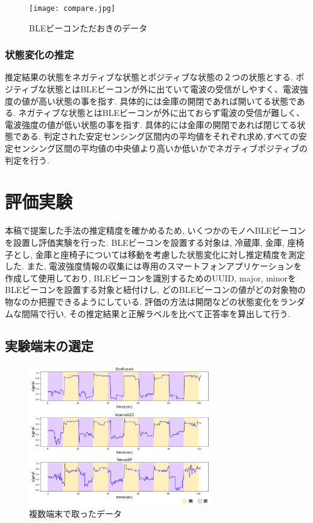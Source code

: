 \documentclass[Japanese]{dicomopapers}
\begin{document}
\begin{figure}[ht]
 \centering
 \texttt{[image: compare.jpg]}
 \caption{BLEビーコンただおきのデータ}
 \label{compare}
\end{figure}


\subsubsection{状態変化の推定}
推定結果の状態をネガティブな状態とポジティブな状態の２つの状態とする.
ポジティブな状態とはBLEビーコンが外に出ていて電波の受信がしやすく、電波強度の値が高い状態の事を指す. 具体的には金庫の開閉であれば開いてる状態である.
ネガティブな状態とはBLEビーコンが外に出ておらず電波の受信が難しく、電波強度の値が低い状態の事を指す. 具体的には金庫の開閉であれば閉じてる状態である.
判定された安定センシング区間内の平均値をそれぞれ求め,すべての安定センシング区間の平均値の中央値より高いか低いかでネガティブポジティブの判定を行う.





\section{評価実験}

本稿で提案した手法の推定精度を確かめるため, いくつかのモノへBLEビーコンを設置し評価実験を行った.
BLEビーコンを設置する対象は, 冷蔵庫, 金庫, 座椅子とし, 金庫と座椅子については移動を考慮した状態変化に対し推定精度を測定した.
また, 電波強度情報の収集には専用のスマートフォンアプリケーションを作成して使用しており, BLEビーコンを識別するためのUUID, major, minorをBLEビーコンを設置する対象と紐付けし, どのBLEビーコンの値がどの対象物の物なのか把握できるようにしている.
評価の方法は開閉などの状態変化をランダムな間隔で行い, その推定結果と正解ラベルを比べて正答率を算出して行う.

\subsection{実験端末の選定}

\begin{figure}[ht]
    \centering
    \includegraphics[width=8cm]{mix.png}
    \caption{複数端末で取ったデータ}
    \label{multi-data}
\end{figure}
\end{document}
